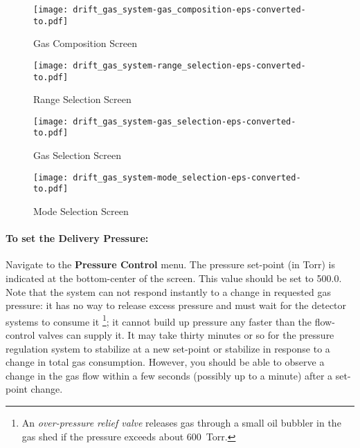 {\begin{center}
\begin{figure}[hbt]
\begin{minipage}{2.7in}
\texttt{[image: drift\_gas\_system-gas\_composition-eps-converted-to.pdf]}
\caption{Gas Composition Screen\label{fig:gas_composition}}
\end{minipage}
\begin{minipage}{2.7in}
\texttt{[image: drift\_gas\_system-range\_selection-eps-converted-to.pdf]}
\caption{Range Selection Screen\label{fig:range_selection}}
\end{minipage}
\end{figure}
\begin{figure}[hbt]
\begin{minipage}{2.7in}
\texttt{[image: drift\_gas\_system-gas\_selection-eps-converted-to.pdf]}
\caption{Gas Selection Screen\label{fig:gas_selection}}
\end{minipage}
\begin{minipage}{2.7in}
\texttt{[image: drift\_gas\_system-mode\_selection-eps-converted-to.pdf]}
\caption{Mode Selection Screen\label{fig:mode_selection}}
\end{minipage}
\end{figure}
\end{center}

\paragraph{To set the Delivery Pressure:}

Navigate to the {\bf Pressure Control} menu. The pressure set-point (in
Torr) is indicated at the bottom-center of the screen. This value
should be set to 500.0. Note that the system can not respond instantly
to a change in requested gas pressure: it has no way to release excess
pressure and must wait for the detector systems to consume it
\footnote{An \emph{over-pressure relief valve} releases gas through a
small oil bubbler in the gas shed if the pressure exceeds about
600~Torr.}; it cannot build up pressure any faster than the
flow-control valves can supply it. It may take thirty minutes or so
for the pressure regulation system to stabilize at a new set-point or
stabilize in response to a change in total gas consumption. However,
you should be able to observe a change in the gas flow within a few
seconds (possibly up to a minute) after a set-point change.

}
